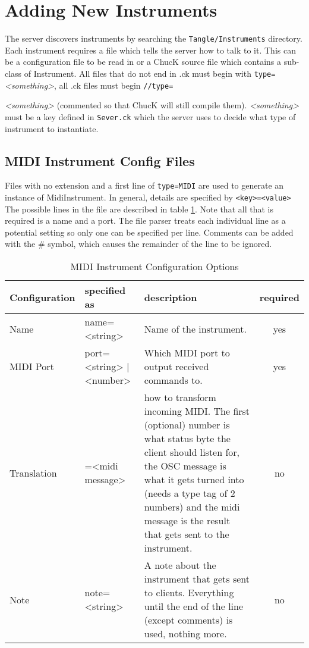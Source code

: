 \documentclass[11pt]{article}
\begin{document}
\section{Adding New Instruments}
The server discovers instruments by searching the \texttt{Tangle/Instruments} directory. Each instrument requires a file which tells the server how to talk to it. This can be a 
configuration file to be read in or a ChucK source file which contains a sub-class of Instrument.
All files that do not end in .ck must begin with \texttt{type=}\textit{<something>}, all .ck files must begin \texttt{//type=}{\textit{<something>} (commented so that ChucK will
still compile them). \textit{<something>} must be a key defined in \texttt{Sever.ck} which the server uses to decide what type of instrument to instantiate.

\subsection{MIDI Instrument Config Files}
Files with no extension and a first line of \texttt{type=MIDI} are used to generate an instance of MidiInstrument. In general, details are specified by \texttt{<key>=<value>}
The possible lines in the file are described in table \ref{tab:midifile}. Note that all that is required is a name and a port. The file parser treats each individual line
as a potential setting so only one can be specified per line. Comments can be added with the \# symbol, which causes the remainder of the line to be ignored.

\begin{table} [h]
\caption{MIDI Instrument Configuration Options}
\label{tab:midifile}
\begin{tabularx} {\textwidth} {| l | >{\ttfamily}X | X | c |}
\hline
Configuration & specified as & description & required \\
\hline \hline
Name & name=<string> & Name of the instrument. & yes \\
\hline
MIDI Port & port=<string> | <number> & Which MIDI port to output received commands to. & yes \\
\hline
Translation & [<number>=]<osc message>=<midi message> & how to transform incoming MIDI. 
												The first (optional) number is what status 
												byte the client should listen for,
												the OSC message is what it gets turned
												into (needs a type tag of 2 numbers)
												and the midi message is the result
												that gets sent to the instrument. & no \\
\hline
Note & note=<string> & A note about the instrument that gets sent to clients. Everything until the end of 
				     the line (except comments) is used, nothing more. & no \\
\hline


\end{tabularx}
\end{table}}
\end{document}
